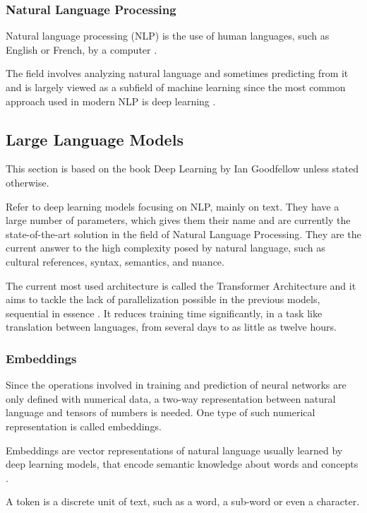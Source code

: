 \subsubsection{Natural Language Processing}

\begin{definition}
    Natural language processing (NLP) is the use of human languages, such as
English or French, by a computer \cite[p.461]{goodfellow2016deep}. 
\end{definition}

The field involves analyzing natural language and sometimes predicting from it \cite{goodfellow2016deep} and is largely viewed as a subfield of machine learning since the most common approach used in modern NLP is deep learning \cite[Preface, p. xi]{zhang2021natural}.

\subsection{Large Language Models}
This section is based on the book Deep Learning by Ian Goodfellow \cite{goodfellow2016deep} unless stated otherwise.

Refer to deep learning models focusing on NLP, mainly on text. They have a large number of parameters, which gives them their name and are currently the state-of-the-art solution in the field of Natural Language Processing. They are the current answer to the high complexity posed by natural language, such as cultural references, syntax, semantics, and nuance.

The current most used architecture is called the Transformer Architecture and it aims to tackle the lack of parallelization possible in the previous models, sequential in essence \cite{vaswani2017attention}. It reduces training time significantly, in a task like translation between languages, from several days \cite{bahdanau2014neural} to as little as twelve hours.

\subsubsection{Embeddings}

Since the operations involved in training and prediction of neural networks are only defined with numerical data, a two-way representation between natural language and tensors of numbers is needed. One type of such numerical representation is called embeddings.

\begin{definition}
    Embeddings are vector representations of natural language usually learned by deep learning models, that encode semantic knowledge about words and concepts \cite{goodfellow2016deep}.
\end{definition}
A token is a discrete unit of text, such as a word, a sub-word or even a character.

